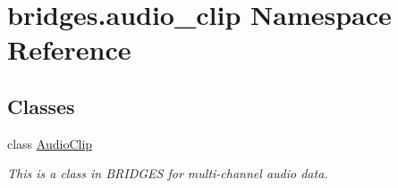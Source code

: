 \hypertarget{namespacebridges_1_1audio__clip}{}\section{bridges.\+audio\+\_\+clip Namespace Reference}
\label{namespacebridges_1_1audio__clip}
\subsection*{Classes}
\begin{DoxyCompactItemize}
\item 
class \hyperlink{classbridges_1_1audio__clip_1_1_audio_clip}{Audio\+Clip}
\begin{DoxyCompactList}\small\item\em This is a class in B\+R\+I\+D\+G\+ES for multi-\/channel audio data. \end{DoxyCompactList}\end{DoxyCompactItemize}
